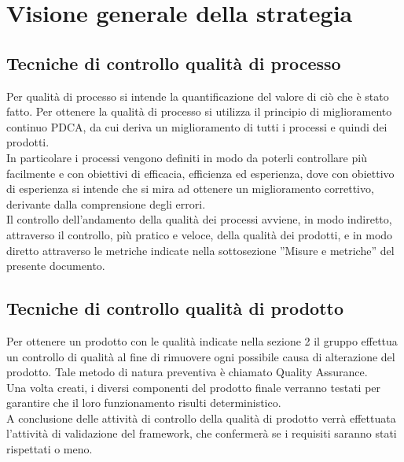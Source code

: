 
\section{Visione generale della strategia}
\subsection{Tecniche di controllo qualità di processo}
	Per qualità di processo si intende la quantificazione del valore di ciò che è stato fatto. Per ottenere la qualità di processo si utilizza il 
	principio di miglioramento continuo PDCA, da cui deriva un miglioramento di tutti i processi e quindi dei prodotti.\\
	In particolare i processi vengono definiti in modo da poterli controllare più facilmente e con obiettivi di efficacia, efficienza ed esperienza, 
	dove con obiettivo di esperienza si intende che si mira ad ottenere un miglioramento correttivo, derivante dalla comprensione degli errori.\\
	Il controllo dell'andamento della qualità dei processi avviene, in modo indiretto, attraverso il controllo, più pratico e veloce, della qualità dei prodotti, e in modo diretto attraverso le metriche indicate nella sottosezione ''Misure e metriche'' del presente documento.
\subsection{Tecniche di controllo qualità di prodotto}
	Per ottenere un prodotto con le qualità indicate nella sezione 2 il gruppo \groupname{} effettua un controllo di qualità al fine di rimuovere ogni possibile causa di alterazione del prodotto. Tale metodo di natura preventiva è chiamato Quality Assurance.\\
	Una volta creati, i diversi componenti del prodotto finale verranno testati per garantire che il loro funzionamento risulti deterministico.\\
	A conclusione delle attività di controllo della qualità di prodotto verrà effettuata l'attività di validazione del framework, che confermerà se i requisiti saranno stati rispettati o meno.
